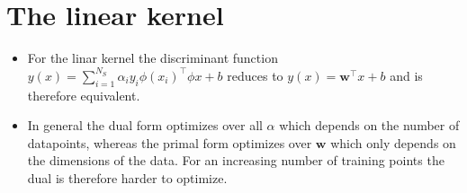 
\section*{The linear kernel} %
\label{sec:the_linear_kernel}
\begin{itemize}
	\item For the linar kernel the discriminant function $y(x) = \sum_{i=1}^{N_S} \alpha_i y_i \phi(x_i)^{\top}\phi{x} + b$ reduces to $y(x) = \mathbf{w}^{\top}x + b$ and is therefore equivalent.
	\item In general the dual form optimizes over all $\alpha$ which depends on the number of datapoints, whereas the primal form optimizes over $\mathbf{w}$ which only depends on the dimensions of the data. For an increasing number of training points the dual is therefore harder to optimize.
\end{itemize}

